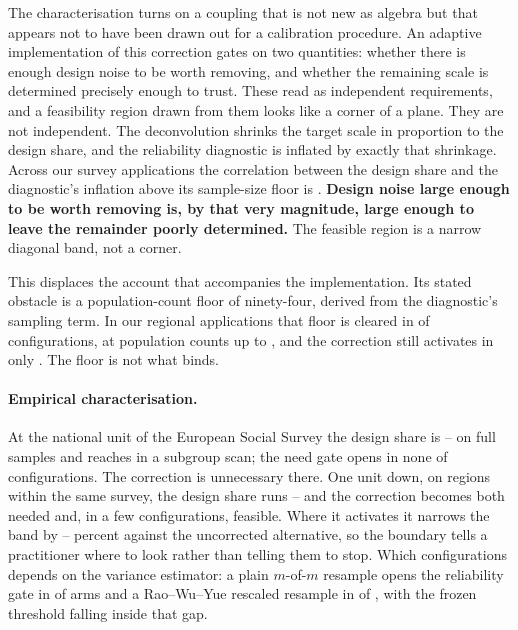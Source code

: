 The characterisation turns on a coupling that is not new as algebra but that
appears not to have been drawn out for a calibration procedure. An adaptive
implementation of this correction gates on two quantities: whether there is
enough design noise to be worth removing, and whether the remaining scale is
determined precisely enough to trust. These read as independent requirements,
and a feasibility region drawn from them looks like a corner of a plane. They
are not independent. The deconvolution shrinks the
target scale in proportion to the design share, and the reliability diagnostic
is inflated by exactly that shrinkage. Across our survey applications the
correlation between the design share and the diagnostic's inflation above its
sample-size floor is \RegCorrRhoRatio. \textbf{Design noise large enough to be
worth removing is, by that very magnitude, large enough to leave the remainder
poorly determined.} The feasible region is a narrow diagonal band, not a corner.

This displaces the account that accompanies the implementation. Its stated
obstacle is a population-count floor of ninety-four, derived from the
diagnostic's sampling term. In our regional applications that floor is cleared in
\RegFloorCleared{} of \RegConfigs{} configurations, at population counts up to
\RegKmax, and the correction still activates in only \RegActivations. The
floor is not what binds.

\paragraph{Empirical characterisation.} At the national unit of the European
Social Survey the design share is \NatRhoLo--\NatRhoHi{} on full samples and
reaches \NatScanHi{} in a subgroup scan; the need gate opens in none of
\NatConfigs{} configurations. The correction is unnecessary there. One unit
down, on regions within the same survey, the design share runs
\RegRhoLo--\RegRhoHi{} and the correction becomes both needed and, in a few
configurations, feasible. Where it activates it narrows the band by
\WidGainLo--\WidGainHi{} percent against the uncorrected alternative, so the
boundary tells a practitioner where to look rather than telling them to stop. Which configurations depends on the variance
estimator: a plain $m$-of-$m$ resample opens the reliability gate in
\VerMofmOpen{} of \VerMofmN{} arms and a Rao--Wu--Yue rescaled resample in
\VerRwyOpen{} of \VerRwyN, with the frozen threshold falling inside that gap.

